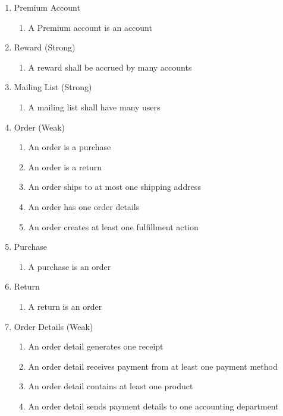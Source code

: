 \documentclass{article}
\begin{document}
\begin{enumerate}
\item Premium Account
\begin{enumerate}
	\item A Premium account is an account
\end{enumerate}

\item Reward (Strong)
\begin{enumerate}
	\item A reward shall be accrued by many accounts
\end{enumerate}
	
\item Mailing List (Strong)
\begin{enumerate}
	\item A mailing list shall have many users
\end{enumerate}

\item Order (Weak)
\begin{enumerate}
	\item An order is a purchase
	\item An order is a return
	\item An order ships to at most one shipping address
	\item An order has one order details
	\item An order creates at least one fulfillment action
\end{enumerate}

\item Purchase
\begin{enumerate}
	\item A purchase is an order
\end{enumerate}

\item Return
\begin{enumerate}
	\item A return is an order
\end{enumerate}

\item Order Details (Weak)
\begin{enumerate}
	\item An order detail generates one receipt
	\item An order detail receives payment from at least one payment method
	\item An order detail contains at least one product
	\item An order detail sends payment details to one accounting department
\end{enumerate}
	

\end{enumerate}
\end{document}
